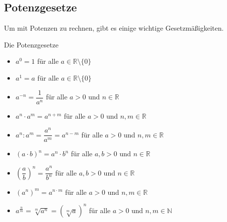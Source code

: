 \subsection{Potenzgesetze}
Um mit Potenzen zu rechnen, gibt es einige wichtige Gesetzmäßigkeiten.
\begin{merke}{Die Potenzgesetze}{} 
\begin{itemize}
    \item $a^0 = 1$ für alle $a\in \mathds{R}\setminus\{0\}$
    \item $a^1 =a$ für alle $a\in \mathds{R}\setminus\{0\}$
    \item $a^{-n} = \dfrac{1}{a^n}$ für alle $a>0$ und $n \in \mathds{R}$
    \item $a^n \cdot a^m = a^{n+m}$ für alle $a>0$ und $n,m \in \mathds{R}$
    \item $a^n : a^m = \dfrac{a^n}{a^m} = a^{n-m}$ für alle $a>0$ und $n,m \in \mathds{R}$
    \item $(a\cdot b)^n = a^n \cdot b^n$ für alle $a,b>0$ und $n \in \mathds{R}$
    \item $\left(\dfrac{a}{b}\right)^n = \dfrac{a^n}{b^n}$ für alle $a,b>0$ und $n \in \mathds{R}$
    \item $ \left( a^n \right)^m = a^{n\cdot m}$ für alle $a>0$ und $n,m \in \mathds{R}$
    \item $a^{\frac{n}{m}} = \sqrt[m]{a^n} = \left( \sqrt[m]{a}\right)^n$ für alle $a>0$ und $n,m \in \mathds{N}$
\end{itemize}
\end{merke}
